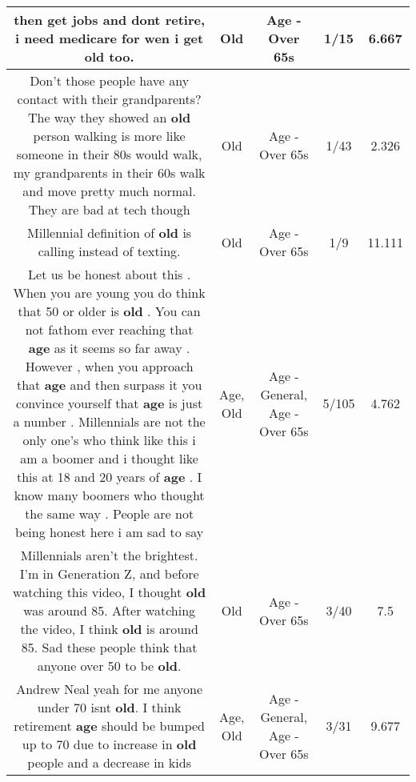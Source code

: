 \documentclass[11pt]{article}
\newlength\mylength
\begin{document}
\begin{center}
\begin{longtable}{|C{.65\mylength}|C{.30\mylength}|C{.12\mylength}|C{.12\mylength}|C{.12\mylength}|}
  \small then get jobs and dont retire, i need medicare for wen i get \textbf{old} too.\normalsize   & Old & Age - Over 65s & 1/15 & 6.667 \\  \hline
  \small Don't those people have any contact with their grandparents? The way they showed an \textbf{old} person walking is more like someone in their 80s would walk, my grandparents in their 60s walk and move pretty much normal. They are bad at tech though\normalsize   & Old & Age - Over 65s & 1/43 & 2.326 \\  \hline
  \small Millennial definition of \textbf{old} is calling instead of texting.\normalsize   & Old & Age - Over 65s & 1/9 & 11.111 \\  \hline
  \small Let us be honest about this . When you are young you do think that 50 or older is \textbf{old} . You can not fathom ever reaching that \textbf{age} as it seems so far away . However , when you approach that \textbf{age} and then surpass  it you convince yourself that \textbf{age} is just a number . Millennials are not the only one's who think like this i am  a boomer and i thought like this at 18 and 20 years of \textbf{age} . I know many boomers who thought the same way  . People are not being honest here i am sad to say\normalsize   & Age, Old & Age - General, Age - Over 65s & 5/105 & 4.762 \\  \hline
  \small Millennials aren't the brightest. I'm in Generation Z, and before watching this video, I thought \textbf{old} was around 85. After watching the video, I think \textbf{old} is around 85. Sad these people think that anyone over 50 to be \textbf{old}.\normalsize   & Old & Age - Over 65s & 3/40 & 7.5 \\  \hline
  \small Andrew Neal yeah for me anyone under 70 isnt \textbf{old}. I think retirement \textbf{age} should be bumped up to 70 due to increase in \textbf{old} people and a decrease in kids\normalsize   & Age, Old & Age - General, Age - Over 65s & 3/31 & 9.677 \\  \hline

\end{longtable}
\end{center}
\end{document}
